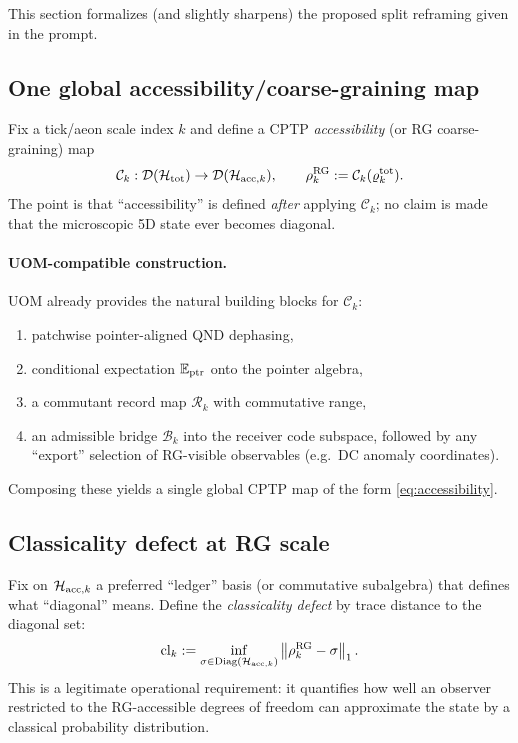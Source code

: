 \documentclass[11pt]{article}
\theoremstyle{definition}
\theoremstyle{plain}
\theoremstyle{remark}
\newcommand{\cH}{\mathcal H}
\newcommand{\cD}{\mathcal D}
\newcommand{\cB}{\mathcal B}
\newcommand{\cC}{\mathcal C}
\newcommand{\cR}{\mathcal R}
\newcommand{\norm}[1]{\left\lVert #1\right\rVert}
\begin{document}
This section formalizes (and slightly sharpens) the proposed split reframing given in the prompt.

\subsection{One global accessibility/coarse-graining map}
\label{subsec:accessibility-map}

Fix a tick/aeon scale index $k$ and define a CPTP \emph{accessibility} (or RG coarse-graining) map
\begin{equation}
\cC_k:\cD(\cH_{\rm tot})\to \cD(\cH_{{\rm acc},k}),
\qquad
\rho_k^{\rm RG}:=\cC_k(\varrho_k^{\rm tot}).
\label{eq:accessibility}
\end{equation}
The point is that ``accessibility'' is defined \emph{after} applying $\cC_k$; no claim is made that the microscopic
5D state ever becomes diagonal.

\paragraph{UOM-compatible construction.}
UOM already provides the natural building blocks for $\cC_k$:
\begin{enumerate}[leftmargin=2em]
\item patchwise pointer-aligned QND dephasing,
\item conditional expectation $\mathbb E_{\rm ptr}$ onto the pointer algebra,
\item a commutant record map $\cR_k$ with commutative range,
\item an admissible bridge $\cB_k$ into the receiver code subspace, followed by any ``export'' selection of RG-visible
observables (e.g.\ DC anomaly coordinates).
\end{enumerate}
Composing these yields a single global CPTP map of the form \eqref{eq:accessibility}.

\subsection{Classicality defect at RG scale}
\label{subsec:classicality-defect}

Fix on $\cH_{{\rm acc},k}$ a preferred ``ledger'' basis (or commutative subalgebra) that defines what ``diagonal'' means.
Define the \emph{classicality defect} by trace distance to the diagonal set:
\begin{equation}
\mathrm{cl}_k
:=\inf_{\sigma\in\mathrm{Diag}(\cH_{{\rm acc},k})}\norm{\rho_k^{\rm RG}-\sigma}_1.
\label{eq:cl-def}
\end{equation}
This is a legitimate operational requirement: it quantifies how well an observer restricted to the RG-accessible degrees
of freedom can approximate the state by a classical probability distribution.
\end{document}
